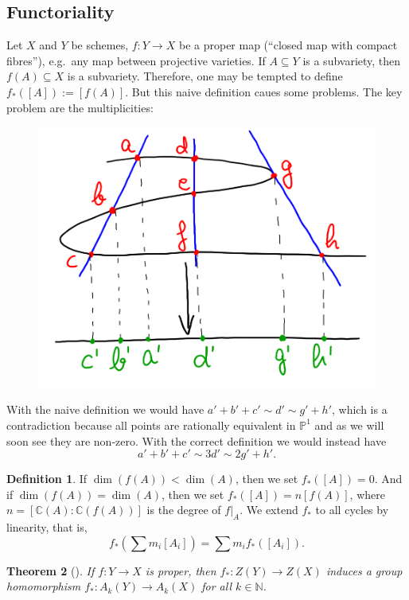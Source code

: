 \documentclass[12pt,a4paper]{amsart}
\theoremstyle{plain}
\newtheorem{thm}{Theorem}[section]
\theoremstyle{definition}
\newtheorem{defn}[thm]{Definition}
\theoremstyle{remark}
\begin{document}
\subsection{Functoriality \cite[\S 1.2.6]{eh16}}

Let $X$ and $Y$ be schemes, $f\colon Y\to X$ be a proper map (``closed map with compact fibres''), e.g.~any map between projective varieties.
If $A\subseteq Y$ is a subvariety, then $f(A)\subseteq X$ is a subvariety.
Therefore, one may be tempted to define $f_{*}([A]):=[f(A)]$.
But this naive definition caues some problems.
The key problem are the multiplicities:
\begin{figure}[H]
    \centering
    \includegraphics[scale=.9]{pictures/pushforward}
\end{figure}

With the naive definition we would have $a'+b'+c'\sim d'\sim g'+h'$, which is a contradiction because all points are rationally equivalent in $\mathbb{P}^{1}$ and as we will soon see they are non-zero.
With the correct definition we would instead have
\[ a'+b'+c'\sim 3d'\sim 2g'+h'. \]

\begin{defn}
    If $\dim(f(A))<\dim(A)$, then we set $f_{*}([A])=0$.
    And if $\dim(f(A))=\dim(A)$, then we set $f_{*}([A])=n[f(A)]$, where $n=[\mathbb{C}(A):\mathbb{C}(f(A))]$ is the degree of $f|_{A}$.
    We extend $f_{*}$ to all cycles by linearity, that is,
    \[ f_{*}(\sum m_{i}[A_{i}])=\sum m_{i}f_{*}([A_{i}]). \]
\end{defn}

\begin{thm}[{\cite[\S 1.4]{ful98}}]
    If $f\colon Y\to X$ is proper, then $f_{*}\colon Z(Y)\to Z(X)$ induces a group homomorphism $f_{*}\colon A_{k}(Y)\to A_{k}(X)$ for all $k\in \mathbb{N}$.
\end{thm}
\end{document}
